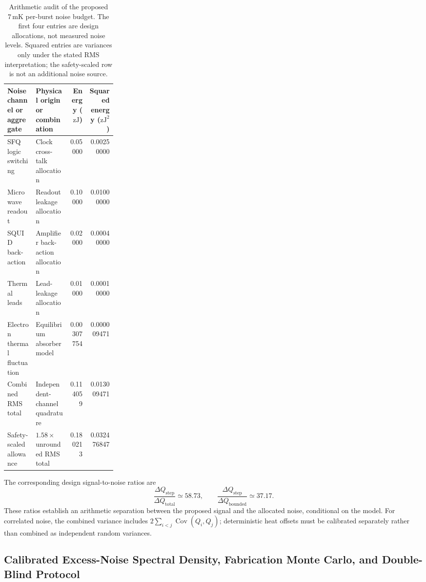 \documentclass[11pt,letterpaper]{article}
\theoremstyle{plain}
\begin{document}
\begin{table}[htbp]
\centering
\scriptsize
\begin{tabularx}{\linewidth}{@{}L{0.26\linewidth}Yrr@{}}
\toprule
Noise channel or aggregate & Physical origin or combination &
Energy (\(\mathrm{zJ}\)) & Squared energy (\(\mathrm{zJ}^2\)) \\
\midrule
SFQ logic switching & Clock cross-talk allocation & 0.05000 & 0.00250000 \\
Microwave readout & Readout leakage allocation & 0.10000 & 0.01000000 \\
SQUID back-action & Amplifier back-action allocation & 0.02000 & 0.00040000 \\
Thermal leads & Lead-leakage allocation & 0.01000 & 0.00010000 \\
Electron thermal fluctuation & Equilibrium absorber model & 0.00307754 & 0.000009471 \\
\midrule
Combined RMS total & Independent-channel quadrature & 0.114059 & 0.013009471 \\
Safety-scaled allowance & \(1.58\times\) unrounded RMS total & 0.180213 & 0.032476847 \\
\bottomrule
\end{tabularx}
\caption{Arithmetic audit of the proposed \(7\,\mathrm{mK}\) per-burst
noise budget.  The first four entries are design allocations, not measured
noise levels.  Squared entries are variances only under the stated RMS
interpretation; the safety-scaled row is not an additional noise source.}
\label{tab:noise_budget_7mk}
\end{table}

The corresponding design signal-to-noise ratios are
\begin{equation}
\label{eq:noise-budget-snr}
 \frac{\Delta Q_{\text{step}}}{\Delta Q_{\text{total}}}
 \simeq58.73,
 \qquad
 \frac{\Delta Q_{\text{step}}}{\Delta Q_{\text{bounded}}}
 \simeq37.17.
\end{equation}
These ratios establish an arithmetic separation between the proposed signal
and the allocated noise, conditional on the model.  For correlated noise,
the combined variance includes \(2\sum_{i<j}\operatorname{Cov}(Q_i,Q_j)\); deterministic heat offsets
must be calibrated separately rather than combined as independent random variances.

\subsection{Calibrated Excess-Noise Spectral Density, Fabrication Monte Carlo, and Double-Blind Protocol}
\label{sec:calorimetry-psd-monte-carlo-blinding}
\end{document}
